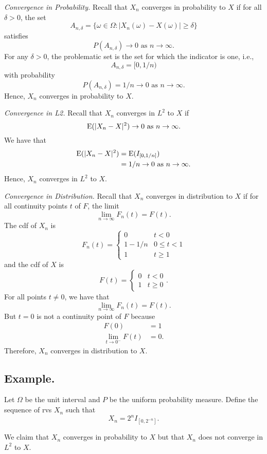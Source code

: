 \documentclass[titlepage]{article}
\begin{document}
\textit{Convergence in Probability.} Recall that $X_{n}$ converges in probability to $X$ if for all $\delta > 0$, the set
$$A_{n,\delta} = \{\omega \in \Omega: |X_{n}(\omega) - X(\omega)| \geq \delta\}$$
satisfies
$$P(A_{n,\delta}) \to 0 \text{ as } n \to \infty.$$
For any $\delta > 0$, the problematic set is the set for which the indicator is one, i.e., 
$$A_{n,\delta} = [0, 1/n)$$
with probability 
$$P(A_{n,\delta}) = 1/n \to 0 \text{ as } n \to \infty.$$
Hence, $X_{n}$ converges in probability to $X$.

\textit{Convergence in L2.} Recall that $X_{n}$ converges in $L^{2}$ to $X$ if
$$\text{E}(|X_{n} - X|^{2}) \to 0 \text{ as } n \to \infty.$$
We have that 
\begin{align*}
    \text{E}(|X_{n} - X|^{2}) &= \text{E}(I_{[0, 1/n]}) \\
                        &= 1/n \to 0 \text{ as } n \to \infty.
\end{align*}
Hence, $X_{n}$ converges in $L^{2}$ to $X$.

\textit{Convergence in Distribution.} Recall that $X_{n}$ converges in distribution to $X$ if for all continuity points $t$ of $F$, the limit 
$$\lim_{n \to \infty}F_{n}(t) = F(t).$$
The cdf of $X_{n}$ is 
$$F_{n}(t) = \begin{cases} 0 & t < 0 \\ 1 - 1/n & 0 \leq t < 1 \\ 1 & t \geq 1 \end{cases}$$
and the cdf of $X$ is 
$$F(t) = \begin{cases} 0 & t < 0 \\ 1 & t \geq 0 \end{cases}.$$
For all points $t \neq 0$, we have that
$$\lim_{n \to \infty}F_{n}(t) = F(t).$$
But $t = 0$ is not a continuity point of $F$ because 
\begin{align*}
                      F(0) &= 1 \\
    \lim_{t \to 0^{-}}F(t) &= 0.
\end{align*}
Therefore, $X_{n}$ converges in distribution to $X$.

\subsection{Example.} Let $\Omega$ be the unit interval and $P$ be the uniform probability measure. Define the sequence of rvs $X_{n}$ such that 
$$X_{n} = 2^{n}I_{[0, 2^{-n}]}.$$

We claim that $X_{n}$ converges in probability to $X$ but that $X_{n}$ does not converge in $L^{2}$ to $X$.
\end{document}
